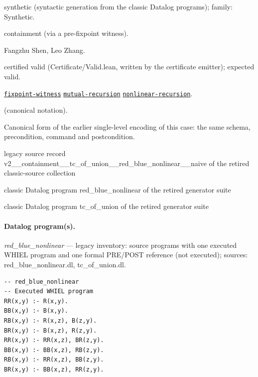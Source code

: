 \documentclass[10pt]{article}
\begin{document}
\begin{description}[leftmargin=2.6cm,style=nextline,itemsep=1pt]

\item[Category] synthetic (syntactic generation from the classic Datalog programs); family: Synthetic.

\item[Kind] containment (via a pre-fixpoint witness).

\item[Contributors] Fangzhu Shen, Leo Zhang.

\item[Status] certified valid (Certificate/Valid.lean, written by the certificate emitter); expected valid.

\item[Tags] \hyperref[tag:fixpoint-witness]{\texttt{fixpoint-witness}} \hyperref[tag:mutual-recursion]{\texttt{mutual-recursion}} \hyperref[tag:nonlinear-recursion]{\texttt{nonlinear-recursion}}.

\item[Input]  (canonical notation).

\item[Summary] Canonical form of the earlier single-level encoding of this case: the same schema, precondition, command and postcondition.

\item[Sources] {\raggedright legacy source record v2\_\_containment\_\_tc\_of\_union\_\_red\_blue\_nonlinear\_\_naive of the retired classic-source collection \par classic Datalog program red\_blue\_nonlinear of the retired generator suite \par classic Datalog program tc\_of\_union of the retired generator suite\par}

\end{description}

\paragraph{Datalog program(s).}

{\raggedright\textit{red\_blue\_nonlinear} --- legacy inventory: source programs with one executed WHIEL program and one formal PRE/POST reference (not executed); sources: red\_blue\_nonlinear.dl, tc\_of\_union.dl.\par}

\begin{Verbatim}[fontsize=\scriptsize,breaklines=true,breakanywhere=true,frame=single,framesep=1.5mm]
-- red_blue_nonlinear
-- Executed WHIEL program
RR(x,y) :- R(x,y).
BB(x,y) :- B(x,y).
RB(x,y) :- R(x,z), B(z,y).
BR(x,y) :- B(x,z), R(z,y).
RR(x,y) :- RR(x,z), BR(z,y).
BB(x,y) :- BB(x,z), RB(z,y).
RB(x,y) :- RR(x,z), BB(z,y).
BR(x,y) :- BB(x,z), RR(z,y).
\end{Verbatim}
\end{document}
